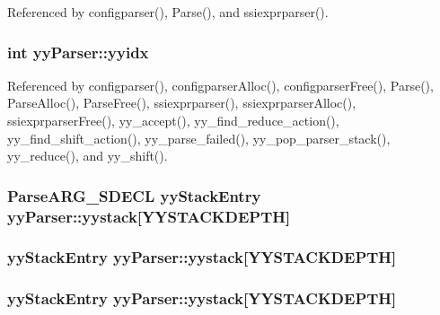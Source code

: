 Referenced by configparser(), Parse(), and ssiexprparser().

\hypertarget{structyyParser_a19abcf4780515fd2debd1ce7a2e29f95}{
\subsubsection[{yyidx}]{\setlength{\rightskip}{0pt plus 5cm}int yy\-Parser\-::yyidx}}\label{structyyParser_a19abcf4780515fd2debd1ce7a2e29f95}


Referenced by configparser(), configparser\-Alloc(), configparser\-Free(), Parse(), Parse\-Alloc(), Parse\-Free(), ssiexprparser(), ssiexprparser\-Alloc(), ssiexprparser\-Free(), yy\-\_\-accept(), yy\-\_\-find\-\_\-reduce\-\_\-action(), yy\-\_\-find\-\_\-shift\-\_\-action(), yy\-\_\-parse\-\_\-failed(), yy\-\_\-pop\-\_\-parser\-\_\-stack(), yy\-\_\-reduce(), and yy\-\_\-shift().

\hypertarget{structyyParser_a269e4ebdc22c0b9102a8e29eebbdc201}{
\subsubsection[{yystack}]{\setlength{\rightskip}{0pt plus 5cm}Parse\-A\-R\-G\-\_\-\-S\-D\-E\-C\-L {\bf yy\-Stack\-Entry} yy\-Parser\-::yystack\mbox{[}{\bf Y\-Y\-S\-T\-A\-C\-K\-D\-E\-P\-T\-H}\mbox{]}}}\label{structyyParser_a269e4ebdc22c0b9102a8e29eebbdc201}
\hypertarget{structyyParser_a7a3b236df0640420355349cc7925305e}{
\subsubsection[{yystack}]{ {\bf yy\-Stack\-Entry} yy\-Parser\-::yystack\mbox{[}{\bf Y\-Y\-S\-T\-A\-C\-K\-D\-E\-P\-T\-H}\mbox{]}}}\label{structyyParser_a7a3b236df0640420355349cc7925305e}
\hypertarget{structyyParser_a0234b21d500d6b491707c741a1712575}{
\subsubsection[{yystack}]{ {\bf yy\-Stack\-Entry} yy\-Parser\-::yystack\mbox{[}{\bf Y\-Y\-S\-T\-A\-C\-K\-D\-E\-P\-T\-H}\mbox{]}}}\label{structyyParser_a0234b21d500d6b491707c741a1712575}


